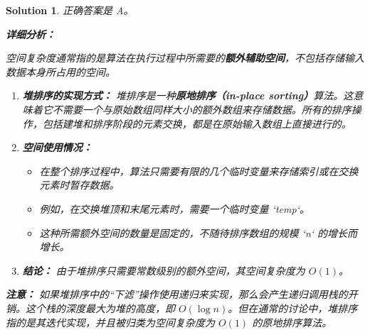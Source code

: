 \documentclass[UTF8]{report}
\newtheorem{solution}{Solution}
\theoremstyle{MyLineTheoremStyle} %
\theoremstyle{MyBlockTheoremStyle} %
\theoremstyle{MySubsubsectionStyle} %
\begin{document}
\begin{solution}
正确答案是 A。

\textbf{详细分析：}

空间复杂度通常指的是算法在执行过程中所需要的\textbf{额外辅助空间}，不包括存储输入数据本身所占用的空间。

\begin{enumerate}
    \item \textbf{堆排序的实现方式：}
    堆排序是一种\textbf{原地排序（in-place sorting）}算法。这意味着它不需要一个与原始数组同样大小的额外数组来存储数据。所有的排序操作，包括建堆和排序阶段的元素交换，都是在原始输入数组上直接进行的。

    \item \textbf{空间使用情况：}
    \begin{itemize}
        \item 在整个排序过程中，算法只需要有限的几个临时变量来存储索引或在交换元素时暂存数据。
        \item 例如，在交换堆顶和末尾元素时，需要一个临时变量 `temp`。
        \item 这种所需额外空间的数量是固定的，不随待排序数组的规模 `n` 的增长而增长。
    \end{itemize}

    \item \textbf{结论：}
    由于堆排序只需要常数级别的额外空间，其空间复杂度为 $O(1)$。
\end{enumerate}

\textbf{注意：}
如果堆排序中的“下滤”操作使用递归来实现，那么会产生递归调用栈的开销。这个栈的深度最大为堆的高度，即 $O(\log n)$。但在通常的讨论中，堆排序指的是其迭代实现，并且被归类为空间复杂度为 $O(1)$ 的原地排序算法。
\end{solution}
\end{document}
